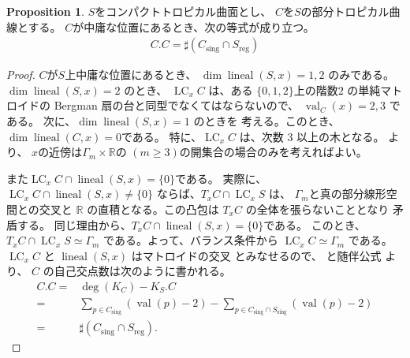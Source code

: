 \documentclass[a4paper,dvipdfmx,reqno,12pt]{amsart}
\theoremstyle{definition}
\newtheorem{proposition}[theorem]{Proposition}
\newcommand{\opn}[1]{\operatorname{#1}}
\numberwithin{equation}{section}
\begin{document}
\begin{proposition}
\label{proposition-self-intersection}
$S$をコンパクトトロピカル曲面とし、
$C$を$S$の部分トロピカル曲線とする。
$C$が中庸な位置にあるとき、次の等式が成り立つ。
\begin{align}
     C.C=\sharp (C_{\mathrm{sing}}\cap S_{\mathrm{reg}})
\end{align}
\end{proposition}
\begin{proof}
$C$が$S$上中庸な位置にあるとき、
$\dim \opn{lineal}(S,x)=1,2$ のみである。
$\dim \opn{lineal}(S,x)=2$ のとき、
$\opn{LC}_x C$ は、ある
$\{0,1,2\}$上の階数$2$
の単純マトロイドの
Bergman 扇の台と同型でなくてはならないので、
$\opn{val}_C(x)=2,3$ である。
次に、$\dim \opn{lineal}(S,x)=1$ のときを
考える。このとき、
$\dim \opn{lineal}(C,x)=0$である。
特に、$\opn{LC}_x C$ は、次数 $3$ 以上の木となる。
\cite[Corollary 2.4]{shaw2015tropical} 
より、
$x$の近傍は$\Gamma_m\times \mathbb{R}$の
$(m\geq 3)$の開集合の場合のみを考えればよい。

また$\opn{LC}_x C\cap \opn{lineal}(S,x)=\{0\}$である。
実際に、$\opn{LC}_x C\cap \opn{lineal}(S,x)\ne \{0\}$
ならば、$T_x C \cap \opn{LC}_x S$ は、
$\Gamma_m$と真の部分線形空間との交叉と $\mathbb{R}$
の直積となる。この凸包は $T_x C$ の全体を張らないこととなり
矛盾する。
同じ理由から、$T_x C\cap \opn{lineal}(S,x)=\{0\}$である。
このとき、$T_x C\cap \opn{LC}_x S\simeq \Gamma_m$
である。よって、バランス条件から
$\opn{LC}_x C\simeq \Gamma_m$ である。
$\opn{LC}_x C$ と $\opn{lineal}(S,x)$ はマトロイドの交叉
とみなせるので、\cite[Theorem 4.2]{MR3032930}
と随伴公式\cite[Theorem 4.11]{shaw2015tropical} より、
$C$ の自己交点数は次のように書かれる。
\begin{align}
C . C=&\opn{deg}(K_C)-K_S . C \\
=& \sum_{p\in C_{\mathrm{sing}}}(\opn{val}(p)-2)
- \sum_{p\in C_{\mathrm{sing}}\cap S_{\mathrm{sing}}}
(\opn{val}(p)-2) \\
=& \sharp (C_{\mathrm{sing}}\cap S_{\mathrm{reg}}).
\end{align}

\end{proof}
\end{document}
